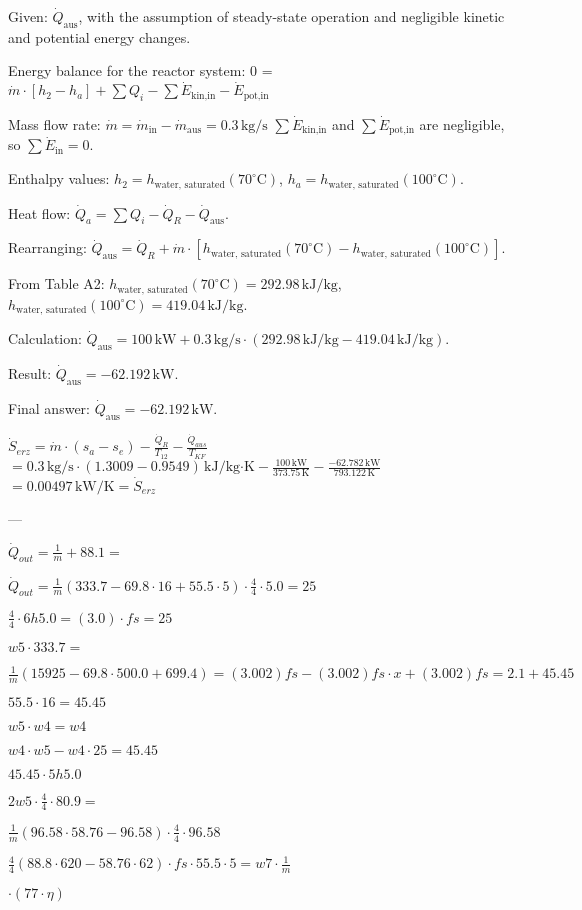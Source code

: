 Given: \( \dot{Q}_{\text{aus}} \), with the assumption of steady-state operation and negligible kinetic and potential energy changes.  

Energy balance for the reactor system:  
0 = \( \dot{m} \cdot [h_2 - h_a] + \sum Q_i - \sum \dot{E}_{\text{kin,in}} - \dot{E}_{\text{pot,in}} \)  

Mass flow rate:  
\( \dot{m} = \dot{m}_{\text{in}} - \dot{m}_{\text{aus}} = 0.3 \, \text{kg/s} \)  
\( \sum \dot{E}_{\text{kin,in}} \) and \( \sum \dot{E}_{\text{pot,in}} \) are negligible, so \( \sum \dot{E}_{\text{in}} = 0 \).  

Enthalpy values:  
\( h_2 = h_{\text{water, saturated}}(70^\circ \text{C}) \),  
\( h_a = h_{\text{water, saturated}}(100^\circ \text{C}) \).  

Heat flow:  
\( \dot{Q}_a = \sum Q_i - \dot{Q}_R - \dot{Q}_{\text{aus}} \).  

Rearranging:  
\( \dot{Q}_{\text{aus}} = \dot{Q}_R + \dot{m} \cdot [h_{\text{water, saturated}}(70^\circ \text{C}) - h_{\text{water, saturated}}(100^\circ \text{C})] \).  

From Table A2:  
\( h_{\text{water, saturated}}(70^\circ \text{C}) = 292.98 \, \text{kJ/kg} \),  
\( h_{\text{water, saturated}}(100^\circ \text{C}) = 419.04 \, \text{kJ/kg} \).  

Calculation:  
\( \dot{Q}_{\text{aus}} = 100 \, \text{kW} + 0.3 \, \text{kg/s} \cdot (292.98 \, \text{kJ/kg} - 419.04 \, \text{kJ/kg}) \).  

Result:  
\( \dot{Q}_{\text{aus}} = -62.192 \, \text{kW} \).  

Final answer: \( \dot{Q}_{\text{aus}} = -62.192 \, \text{kW} \).

\( \dot{S}_{erz} = \dot{m} \cdot (s_a - s_e) - \frac{\dot{Q}_R}{T_{12}} - \frac{\dot{Q}_{aus}}{T_{KF}} \)  
\( = 0.3 \, \text{kg/s} \cdot (1.3009 - 0.9549) \, \text{kJ/kg·K} - \frac{100 \, \text{kW}}{373.75 \, \text{K}} - \frac{-62.782 \, \text{kW}}{793.122 \, \text{K}} \)  
\( = 0.00497 \, \text{kW/K} = \dot{S}_{erz} \)  

---

\( \dot{Q}_{out} = \frac{1}{m} + 88.1 = \)  

\( \dot{Q}_{out} = \frac{1}{m} (333.7 - 69.8 \cdot 16 + 55.5 \cdot 5) \cdot \frac{4}{4} \cdot 5.0 = 25 \)  

\( \frac{4}{4} \cdot 6h5.0 = (3.0) \cdot fs = 25 \)  

\( w5 \cdot 333.7 = \)  

\( \frac{1}{m} (15925 - 69.8 \cdot 500.0 + 699.4) = (3.002) fs - (3.002) fs \cdot x + (3.002) fs = 2.1 + 45.45 \)  

\( 55.5 \cdot 16 = 45.45 \)  

\( w5 \cdot w4 = w4 \)  

\( w4 \cdot w5 - w4 \cdot 25 = 45.45 \)  

\( 45.45 \cdot 5h5.0 \)  

\( 2w5 \cdot \frac{4}{4} \cdot 80.9 = \)  

\( \frac{1}{m} (96.58 \cdot 58.76 - 96.58) \cdot \frac{4}{4} \cdot 96.58 \)  

\( \frac{4}{4} (88.8 \cdot 620 - 58.76 \cdot 62) \cdot fs \cdot 55.5 \cdot 5 = w7 \cdot \frac{1}{m} \)  

\( \cdot (77 \cdot \eta) \)
